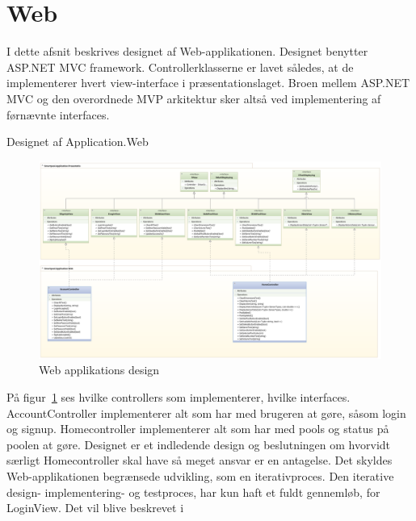 \section{Web}
I dette afsnit beskrives designet af Web-applikationen. Designet benytter ASP.NET MVC framework. Controllerklasserne er lavet således, at de implementerer hvert view-interface i præsentationslaget. Broen mellem ASP.NET MVC og den overordnede MVP arkitektur sker altså ved implementering af førnævnte interfaces.

Designet af Application.Web
\begin{figure}
	\centering
	\includegraphics[width=0.9\linewidth]{figs/design/application_web}
	\caption{Web applikations design}
	\label{fig:web_class}
\end{figure}

På figur~\ref{fig:web_class} ses hvilke controllers som implementerer, hvilke interfaces. AccountController implementerer alt som har med brugeren at gøre, såsom login og signup. Homecontroller implementerer alt som har med pools og status på poolen at gøre. Designet er et indledende design og beslutningen om hvorvidt særligt Homecontroller skal have så meget ansvar er en antagelse. Det skyldes Web-applikationen begrænsede udvikling, som en iterativproces. Den iterative design- implementering- og testproces, har kun haft et fuldt gennemløb, for LoginView. Det vil blive beskrevet i 

